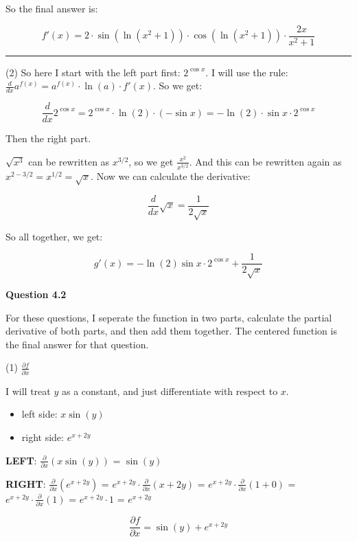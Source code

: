 \documentclass[11pt, a4paper]{article}
\begin{document}
So the final answer is:

\[
f'(x) = 2 \cdot \sin(\ln(x^2+1)) \cdot \cos(\ln(x^2+1)) \cdot \frac{2x}{x^2+1}
\]



\vspace{0.2cm}
{\centering\rule{1.0\linewidth}{0.4pt}\par}
\vspace{0.2cm}


(2) So here I start with the left part first: $2^{\cos x}$. I will use the rule: $\frac{d}{dx} a^{f(x)} = a^{f(x)} \cdot \ln(a) \cdot f'(x)$. So we get: 

\[
\frac{d}{dx} 2^{\cos x} = 2^{\cos x} \cdot \ln(2) \cdot (-\sin x) = -\ln(2) \cdot \sin x \cdot 2^{\cos x}
\]

Then the right part.

$\sqrt{x^3}$ can be rewritten as $x^{3/2}$, so we get $\frac{x^2}{x^{3/2}}$. And this can be rewritten again as $x^{2 - 3/2} = x^{1/2} = \sqrt{x}$. Now we can calculate the derivative:

\[
\frac{d}{dx} \sqrt{x} = \frac{1}{2\sqrt{x}}
\]

So all together, we get:

\[
g'(x) = -\ln(2) \sin x \cdot 2^{\cos x} + \frac{1}{2\sqrt{x}}
\]




\textbf{Question 4.2}

For these questions, I seperate the function in two parts, calculate the partial derivative of both parts, and then add them together. The centered function is the final answer for that question.


(1) $\frac{\partial f}{\partial x}$

I will treat $y$ as a constant, and just differentiate with respect to $x$.

\begin{itemize}
	\item left side: $x\sin(y)$
	\item right side: $e^{x+2y}$
\end{itemize}

\textbf{LEFT}: $\frac{\partial}{\partial x}(x \sin(y))$ = $\sin(y)$

\textbf{RIGHT}: $\frac{\partial}{\partial x}(e^{x+2y})$ = $e^{x+2y} \cdot \frac{\partial}{\partial x}(x+2y)$ = $e^{x+2y} \cdot \frac{\partial}{\partial x}(1+0)$ = $e^{x+2y} \cdot \frac{\partial}{\partial x}(1)$ = $e^{x+2y} \cdot 1$ = $e^{x+2y}$

\[
\frac{\partial f}{\partial x} = \sin(y) + e^{x+2y}
\]
\end{document}
